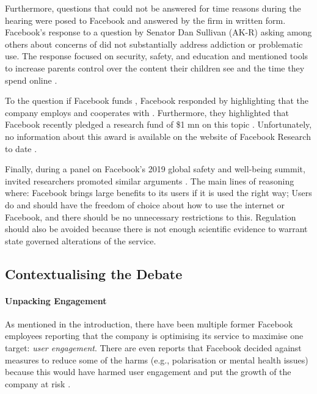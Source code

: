 Furthermore, questions that could not be answered for time reasons during the hearing were posed to Facebook and answered by the firm in written form. 
Facebook's response to a question by Senator Dan Sullivan (AK-R) asking among others about concerns of  did not substantially address addiction or problematic use. 
The response focused on security, safety, and education  and mentioned tools to increase parents control over the content their children see and the time they spend online \citep[p 27]{facebook_inc_post_2018}.

To the question if Facebook funds , Facebook responded by highlighting that the company employs and cooperates with . Furthermore, they highlighted that Facebook recently pledged a research fund of \$1 \gls{mn} on this topic \citep[p 210]{facebook_inc_post_2018} \citep{davis_hard_2017}.
Unfortunately, no information about this award is available on the website of Facebook Research to date \citep{facebook_research_research_nodate}.

Finally, during a panel on Facebook's 2019 global safety and well-being summit, invited researchers promoted similar arguments \citep{groman_so_2019}.
The main lines of reasoning where: Facebook brings large benefits to its users if it is used the right way; Users do and should have the freedom of choice about how to use the internet or Facebook, and there should be no unnecessary restrictions to this. Regulation should also be avoided because there is not enough scientific evidence to warrant state governed alterations of the service. 

\subsection{Contextualising the Debate}
\paragraph{Unpacking Engagement}
As mentioned in the introduction, there have been multiple former Facebook employees reporting that the company is optimising its service to maximise one target: \textit{user engagement}. 
There are even reports that Facebook decided against measures to reduce some of the harms (e.g., polarisation or mental health issues) because this would have harmed user engagement and put the growth of the company at risk \citep{seetharaman_facebook_2020, hao_how_2021}.

